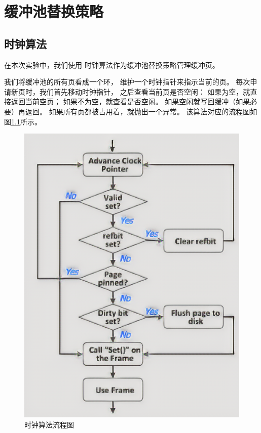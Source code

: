 \documentclass[12pt,onecolumn]{report}
\theoremstyle{plain}
\numberwithin{figure}{chapter}
\numberwithin{table}{chapter}
\numberwithin{lstlisting}{chapter}
\begin{document}
\chapter{缓冲池替换策略}
\section{时钟算法}
在本次实验中，我们使用
时钟算法作为缓冲池替换策略管理缓冲页。

我们将缓冲池的所有页看成一个环，
维护一个时钟指针来指示当前的页。
每次申请新页时，我们首先移动时钟指针，
之后查看当前页是否空闲：
如果为空，就直接返回当前空页；
如果不为空，就查看是否空闲。
如果空闲就写回缓冲（如果必要）再返回。
如果所有页都被占用着，就抛出一个异常。
该算法对应的流程图如图\ref{fig:clock}所示。

\begin{figure}[ht]
  \centering
  \includegraphics{figures/clock.png}
  \caption{时钟算法流程图\label{fig:clock}}
\end{figure}
\end{document}

